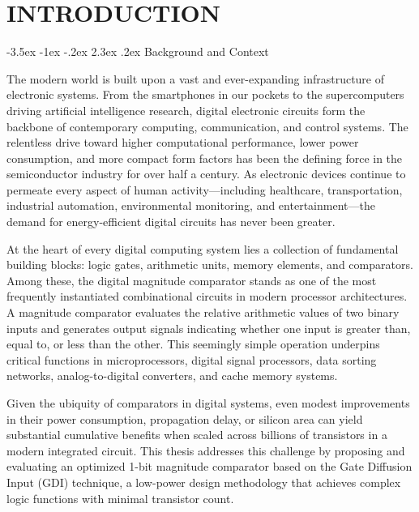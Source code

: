 \documentclass[12pt,a4paper,oneside]{report}
\makeatletter
\renewcommand\section{\@startsection {section}{1}{\z@}%
                                   {-3.5ex \@plus -1ex \@minus -.2ex}%
                                   {2.3ex \@plus.2ex}%
                                   {\normalfont\normalsize\bfseries}}
\makeatother
\begin{document}
\clearpage

\setcounter{page}{1}

\chapter{INTRODUCTION}

\section{Background and Context}

The modern world is built upon a vast and ever-expanding infrastructure of electronic systems. From the smartphones in our pockets to the supercomputers driving artificial intelligence research, digital electronic circuits form the backbone of contemporary computing, communication, and control systems. The relentless drive toward higher computational performance, lower power consumption, and more compact form factors has been the defining force in the semiconductor industry for over half a century. As electronic devices continue to permeate every aspect of human activity—including healthcare, transportation, industrial automation, environmental monitoring, and entertainment—the demand for energy-efficient digital circuits has never been greater.

At the heart of every digital computing system lies a collection of fundamental building blocks: logic gates, arithmetic units, memory elements, and comparators. Among these, the digital magnitude comparator stands as one of the most frequently instantiated combinational circuits in modern processor architectures. A magnitude comparator evaluates the relative arithmetic values of two binary inputs and generates output signals indicating whether one input is greater than, equal to, or less than the other. This seemingly simple operation underpins critical functions in microprocessors, digital signal processors, data sorting networks, analog-to-digital converters, and cache memory systems.

Given the ubiquity of comparators in digital systems, even modest improvements in their power consumption, propagation delay, or silicon area can yield substantial cumulative benefits when scaled across billions of transistors in a modern integrated circuit. This thesis addresses this challenge by proposing and evaluating an optimized 1-bit magnitude comparator based on the Gate Diffusion Input (GDI) technique, a low-power design methodology that achieves complex logic functions with minimal transistor count.
\end{document}
